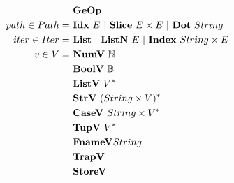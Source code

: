\begin{align*}
    | & ~ \geop \\
%
  path \in Path =& ~ \idxp ~ E ~ | ~ \slicep ~ E \times E ~ | ~ \dotp ~ String \\
%
  iter \in Iter =& ~ \listiter ~ | ~ \listniter ~ E ~|~ \listidxiter ~ String \times E \\
%
  v \in V =& ~ \numv ~ \mathbb N \\
    | & ~ \boolv ~ \mathbb B \\
    | & ~ \listv ~ \seq V \\
    | & ~ \strv ~ \seq{(String \times V)} \\
    | & ~ \casev ~ String \times \seq V \\
    | & ~ \tupv ~ \seq V \\
    | & ~ \fnamev String \\
    | & ~ \trapv \\
    | & ~ \storev \\
\end{align*}





\newpage


